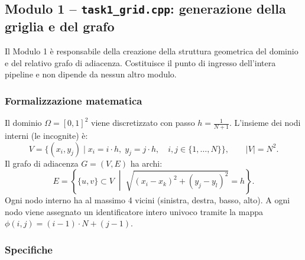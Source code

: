 \documentclass[a4paper,12pt]{article}
\begin{document}
\subsection*{Modulo 1 -- \texttt{task1\_grid.cpp}: generazione della griglia e del grafo}

Il Modulo 1 è responsabile della creazione della struttura geometrica del dominio e del relativo grafo di adiacenza. Costituisce il punto di ingresso dell'intera pipeline e non dipende da nessun altro modulo.

\subsubsection*{Formalizzazione matematica}

Il dominio $\Omega = [0,1]^2$ viene discretizzato con passo $h = \frac{1}{N+1}$. L'insieme dei nodi interni (le incognite) è:
\[
  V = \{ (x_i, y_j) \mid x_i = i \cdot h,\; y_j = j \cdot h,\quad i, j \in \{1, \dots, N\} \}, \qquad |V| = N^2.
\]
Il grafo di adiacenza $G = (V, E)$ ha archi:
\[
  E = \left\{ \{u, v\} \subset V \;\middle|\; \sqrt{(x_i - x_k)^2 + (y_j - y_l)^2} = h \right\}.
\]
Ogni nodo interno ha al massimo 4 vicini (sinistra, destra, basso, alto). A ogni nodo viene assegnato un identificatore intero univoco tramite la mappa $\phi(i,j) = (i-1) \cdot N + (j-1)$.

\subsubsection*{Specifiche}
\end{document}

